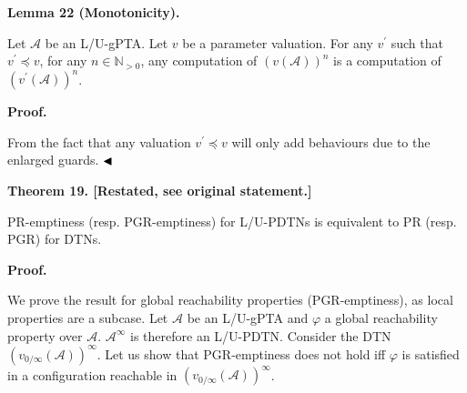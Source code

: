 \documentclass[10pt,a4paper]{article}
\begin{document}
\par\medskip\noindent\textbf{Lemma 22 (Monotonicity).}\par
 
 
Let $\mathcal{A}$ be an L/U-gPTA. Let $v$ be a parameter valuation. For any $v^{\prime}$ such that $v^{\prime}\preceq v$, for any $n\in\mathbb{N}_{>0}$, any computation of ${(v(\mathcal{A}))}^{n}$ is a computation of ${(v^{\prime}(\mathcal{A}))}^{n}$.\par
 
 
 
 
\par\medskip\noindent\textbf{Proof.}\par
 
 
From the fact that any valuation $v^{\prime}\preceq v$ will only add behaviours due to the enlarged guards. $\hfill\blacktriangleleft$\par
 
 
 
 
\par\medskip\noindent\textbf{Theorem 19. [Restated, see original statement.]}\par
 
 
PR-emptiness (resp. PGR-emptiness) for L/U-PDTNs is equivalent to PR (resp. PGR) for DTNs.\par
 
 
 
 
 
 
\par\medskip\noindent\textbf{Proof.}\par
 
 
We prove the result for global reachability properties (PGR-emptiness), as local properties are a subcase. Let $\mathcal{A}$ be an L/U-gPTA and $\varphi$ a global reachability property over $\mathcal{A}$. ${\mathcal{A}}^{\infty}$ is therefore an L/U-PDTN. Consider the DTN ${(v_{0/\infty}(\mathcal{A}))}^{\infty}$. Let us show that PGR-emptiness does not hold iff $\varphi$ is satisfied in a configuration reachable in ${(v_{0/\infty}(\mathcal{A}))}^{\infty}$.\par
 
\end{document}
